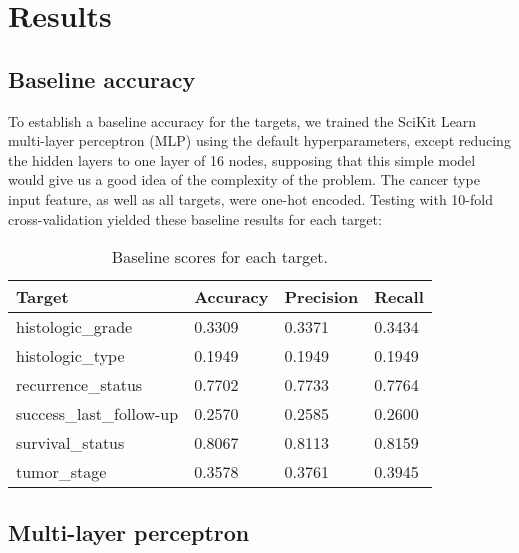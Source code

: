 \documentclass{article}
\begin{document}
\section{Results}

\subsection{Baseline accuracy}

To establish a baseline accuracy for the targets, we trained the SciKit Learn multi-layer perceptron (MLP) using the default hyperparameters, except reducing the hidden layers to one layer of 16 nodes, supposing that this simple model would give us a good idea of the complexity of the problem. The cancer type input feature, as well as all targets, were one-hot encoded. Testing with 10-fold cross-validation yielded these baseline results for each target:

\medskip

\begin{table}[H]
\begin{center}
\begin{tabular}{ *{4}{l} }
    \multicolumn{1}{p{1.5cm}}{\raggedright Target} &  
    \multicolumn{1}{p{1.5cm}}{\raggedright Accuracy} &  
    \multicolumn{1}{p{1.5cm}}{\raggedright Precision} &  
    \multicolumn{1}{p{1.5cm}}{\raggedright Recall} \\ \hline \hline
histologic\_grade       &         0.3309 &          0.3371 &       0.3434 \\ \hline
histologic\_type        &         0.1949 &          0.1949 &       0.1949 \\ \hline
recurrence\_status      &         0.7702 &          0.7733 &       0.7764 \\ \hline
success\_last\_follow-up &         0.2570 &          0.2585 &       0.2600 \\ \hline
survival\_status        &         0.8067 &          0.8113 &       0.8159 \\ \hline
tumor\_stage            &         0.3578 &          0.3761 &       0.3945 \\ \hline
\end{tabular}
\caption{Baseline scores for each target.}
\end{center}
\end{table}

\subsection{Multi-layer perceptron}
\end{document}
